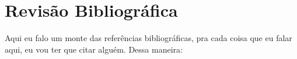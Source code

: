 \chapter{Revisão Bibliográfica}

Aqui eu falo um monte das referências bibliográficas, pra cada coisa que eu falar aqui, eu vou ter que citar alguém. Dessa maneira: \cite{Lan50a}
